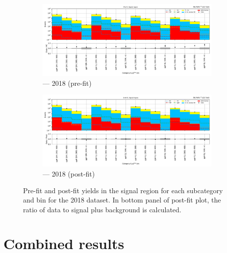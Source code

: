 \begin{figure}[htbp]
    \centering
    \begin{subfigure}[b]{0.9\textwidth}
        \includegraphics[width=\textwidth]{figures/mountain_ranges/2018/ggF/SR_tree_prefit-abs_values_ggF_cats.pdf}
        \caption{\ggH --- 2018 (pre-fit)}
    \end{subfigure}

    \begin{subfigure}[b]{0.9\textwidth}
        \includegraphics[width=\textwidth]{figures/mountain_ranges/2018/ggF/SR_tree_fit_s-abs_values_ggF_cats.pdf}
        \caption{\ggH --- 2018 (post-fit)}
    \end{subfigure}
    \caption[Pre-fit and post-fit yields in the signal region for each \ggH subcategory and \ptmiss bin for the 2018 dataset]{Pre-fit and post-fit yields in the signal region for each \ggH subcategory and \ptmiss bin for the 2018 dataset. In bottom panel of post-fit plot, the ratio of data to signal plus background is calculated.}
    \label{fig:htoinv_mountain_range_ggH_2018}
\end{figure}

\clearpage




\section{Combined results}
\label{sec:htoinv_combined_results}


